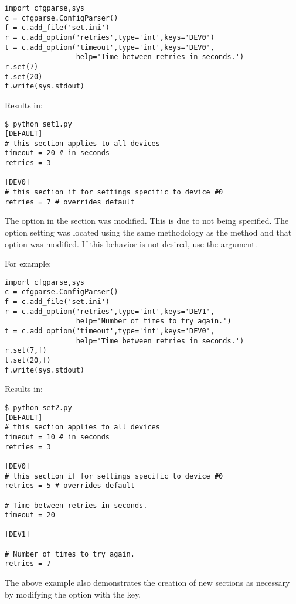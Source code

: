 \documentclass{howto}
\begin{document}
\begin{verbatim}
import cfgparse,sys
c = cfgparse.ConfigParser()
f = c.add_file('set.ini')
r = c.add_option('retries',type='int',keys='DEV0')
t = c.add_option('timeout',type='int',keys='DEV0',
                 help='Time between retries in seconds.')
r.set(7)
t.set(20)
f.write(sys.stdout)
\end{verbatim}

Results in:
\begin{verbatim}
$ python set1.py
[DEFAULT]
# this section applies to all devices
timeout = 20 # in seconds
retries = 3

[DEV0]
# this section if for settings specific to device #0
retries = 7 # overrides default
\end{verbatim}

The  option in the \code{[DEFAULT]} section was modified.  
This is due to  not being specified.  The option setting
was located using the same methodology as the  method and that
option was modified.  If this behavior is not desired, use the 
 argument.

For example:

\begin{verbatim}
import cfgparse,sys
c = cfgparse.ConfigParser()
f = c.add_file('set.ini')
r = c.add_option('retries',type='int',keys='DEV1',
                 help='Number of times to try again.')
t = c.add_option('timeout',type='int',keys='DEV0',
                 help='Time between retries in seconds.')
r.set(7,f)
t.set(20,f)
f.write(sys.stdout)
\end{verbatim}

Results in:
\begin{verbatim}
$ python set2.py
[DEFAULT]
# this section applies to all devices
timeout = 10 # in seconds
retries = 3

[DEV0]
# this section if for settings specific to device #0
retries = 5 # overrides default

# Time between retries in seconds.
timeout = 20

[DEV1]

# Number of times to try again.
retries = 7
\end{verbatim}

The above example also demonstrates the creation of new sections as 
necessary by modifying the  option with the 
key.
\end{document}
